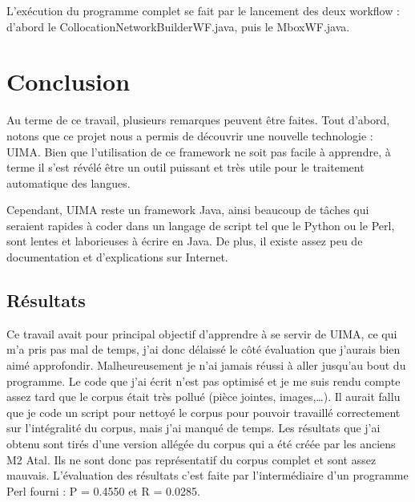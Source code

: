 \documentclass[a4paper]{article}
\begin{document}
L'exécution du programme complet se fait par le lancement des deux workflow : d'abord le CollocationNetworkBuilderWF.java, puis le MboxWF.java.


	\section*{Conclusion}

	Au terme de ce travail, plusieurs remarques peuvent être faites. Tout d'abord, notons que ce projet nous a permis de découvrir une nouvelle technologie : UIMA. Bien que l'utilisation de ce framework ne soit pas facile à apprendre, à terme il s'est révélé être un outil puissant et très utile pour le traitement automatique des langues. 

	Cependant, UIMA reste un framework Java, ainsi beaucoup de tâches qui seraient rapides à coder dans un langage de script tel que le Python ou le Perl, sont lentes et laborieuses à écrire en Java. De plus, il existe assez peu de documentation et d'explications sur Internet.

	\subsection*{Résultats}
	Ce travail avait pour principal objectif d'apprendre à se servir de UIMA, ce qui m'a pris pas mal de temps, j'ai donc délaissé le côté évaluation que j'aurais bien aimé approfondir. Malheureusement je n'ai jamais réussi à aller jusqu'au bout du programme. Le code que j'ai écrit n'est pas optimisé et je me suis rendu compte assez tard que le corpus était très pollué (pièce jointes, images,\dots). Il aurait fallu que je code un script pour nettoyé le corpus pour pouvoir travaillé correctement sur l'intégralité du corpus, mais j'ai manqué de temps. Les résultats que j'ai obtenu sont tirés d'une version allégée du corpus qui a été créée par les anciens M2 Atal. Ils ne sont donc pas représentatif du corpus complet et sont assez mauvais. L'évaluation des résultats c'est faite par l'intermédiaire d'un programme Perl fourni : P = 0.4550 et R = 0.0285. 

	
\end{document}
